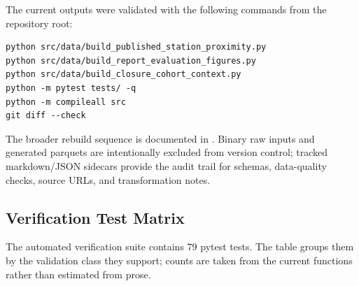 The current outputs were validated with the following commands from the repository root:

\begin{verbatim}
python src/data/build_published_station_proximity.py
python src/data/build_report_evaluation_figures.py
python src/data/build_closure_cohort_context.py
python -m pytest tests/ -q
python -m compileall src
git diff --check
\end{verbatim}

The broader rebuild sequence is documented in . Binary raw inputs and generated parquets are intentionally excluded from version control; tracked markdown/JSON sidecars provide the audit trail for schemas, data-quality checks, source URLs, and transformation notes.

\subsection{Verification Test Matrix}

The automated verification suite contains 79 pytest tests. The table groups them by the validation class they support; counts are taken from the current  functions rather than estimated from prose.

